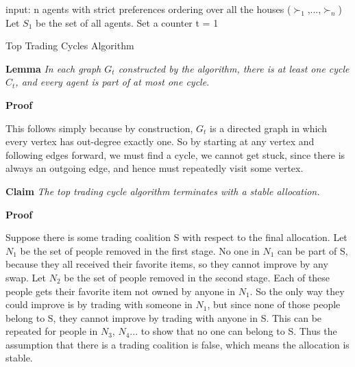 \documentclass[twoside]{article}
\begin{document}
\begin{algorithm}[H]
\SetAlgoLined
 input: n agents with strict preferences ordering over all the houses ($\succ_1$,...,$\succ_n$)\;
 Let $S_1$ be the set of all agents. Set a counter t = 1\;
 \caption{Top Trading Cycles Algorithm}
\end{algorithm}

\textbf{Lemma} \textit{In each graph $G_t$ constructed by the algorithm, there is at least one cycle $C_t$, and every agent is part of at most one cycle.}

\textbf{Proof}

This follows simply because by construction, $G_t$ is a directed graph in which every vertex has out-degree exactly one. So by starting at any vertex and following edges forward, we must find a cycle, we cannot get stuck, since there is always an outgoing edge, and hence must repeatedly visit some vertex.

\textbf{Claim} \textit{The top trading cycle algorithm terminates with a stable allocation.}

\textbf{Proof}

Suppose there is some trading coalition S with respect to the final allocation. Let $N_1$ be the set of people removed in the first stage. No one in $N_1$ can be part of S, because they all received their favorite items, so they cannot improve by any swap. Let $N_2$ be the set of people removed in the second stage. Each of these people gets their favorite item not owned by anyone in $N_1$. So the only way they could improve is by trading with someone in $N_1$, but since none of those people belong to S, they cannot improve by trading with anyone in S. This can be repeated for people in $N_3$, $N_4$... to show that no one can belong to S. Thus the assumption that there is a trading coalition is false, which means the allocation is stable.
\end{document}
